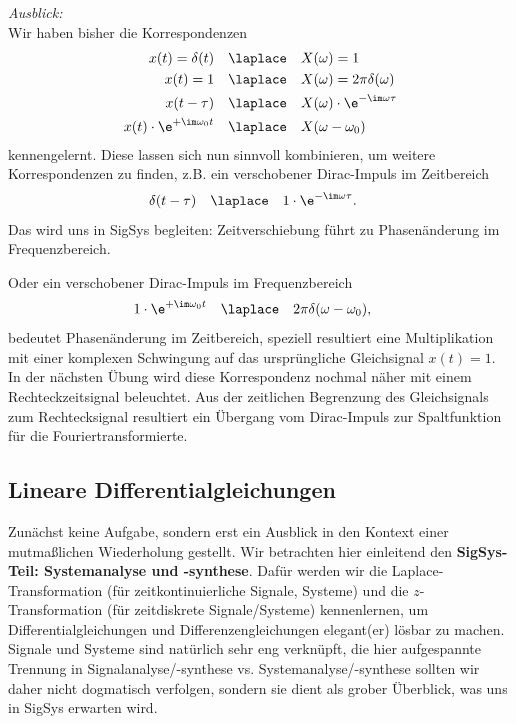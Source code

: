



\begin{mdframed}
\textit{Ausblick:}
%
\\\noindent
Wir haben bisher die Korrespondenzen
\begin{align}
x(t)= \delta(t) &\quad \laplace \quad X(\omega)=1\\
x(t)= 1 &\quad \laplace \quad X(\omega)=2\pi \delta(\omega)\\
x(t - \tau) & \quad \laplace \quad X(\omega) \cdot \e^{-\im\omega \tau}\\
x(t) \cdot \e^{+\im\omega_0 t} & \quad \laplace \quad X(\omega-\omega_0)
\end{align}
kennengelernt.
%
Diese lassen sich nun sinnvoll kombinieren, um weitere Korrespondenzen zu finden,
z.B. ein verschobener Dirac-Impuls im Zeitbereich
\begin{align}
\delta(t-\tau)& \quad \laplace \quad 1 \cdot \e^{-\im\omega \tau}.
\end{align}
Das wird uns in SigSys begleiten: Zeitverschiebung führt zu Phasenänderung im Frequenzbereich.

Oder ein verschobener Dirac-Impuls im Frequenzbereich
\begin{align}
1 \cdot \e^{+\im\omega_0 t} & \quad \laplace \quad 2\pi\delta(\omega-\omega_0),
\end{align}
bedeutet Phasenänderung im Zeitbereich, speziell resultiert eine Multiplikation
mit einer komplexen Schwingung auf das ursprüngliche Gleichsignal $x(t)=1$.
%
In der nächsten Übung wird diese Korrespondenz nochmal näher mit einem
Rechteckzeitsignal beleuchtet. Aus der zeitlichen Begrenzung des Gleichsignals
zum Rechtecksignal resultiert ein Übergang vom Dirac-Impuls zur Spaltfunktion
für die Fouriertransformierte.
\end{mdframed}














\newpage
\subsection{Lineare Differentialgleichungen}
\label{sec:A7BEE9E24E}
%
Zunächst keine Aufgabe, sondern erst ein Ausblick in den Kontext einer mutmaßlichen Wiederholung
gestellt.
Wir betrachten hier einleitend den \textbf{SigSys-Teil: Systemanalyse und -synthese}.
Dafür werden wir die Laplace-Transformation (für zeitkontinuierliche Signale, Systeme)
und die $z$-Transformation (für zeitdiskrete Signale/Systeme) kennenlernen, um
Differentialgleichungen und Differenzengleichungen elegant(er) lösbar zu machen.
%
Signale und Systeme sind natürlich sehr eng verknüpft, die hier aufgespannte
Trennung in Signalanalyse/-synthese vs. Systemanalyse/-synthese
sollten wir daher nicht dogmatisch verfolgen, sondern sie dient als grober
Überblick, was uns in SigSys erwarten wird.

